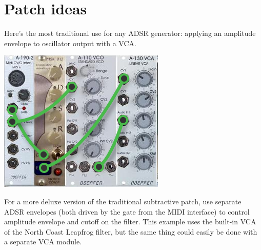 
%
%
%
%
%
%

\chapter{Patch ideas}

Here's the most traditional use for any ADSR generator:  applying an
amplitude envelope to oscillator output with a VCA.

\nopagebreak\noindent
{\hspace*{\fill}\includegraphics[scale=0.78]{patch1.png}\hspace*{\fill}\par} 

For a more deluxe version of the traditional subtractive patch, use separate
ADSR envelopes (both driven by the gate from the MIDI interface) to control
amplitude envelope and cutoff on the filter.  This example uses the built-in
VCA of the North Coast Leapfrog filter, but the same thing could easily be
done with a separate VCA module.

